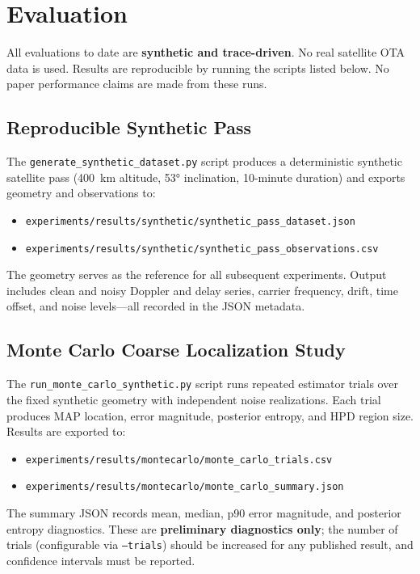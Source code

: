 \section{Evaluation}\label{sec:evaluation}

All evaluations to date are \textbf{synthetic and trace-driven}.
No real satellite OTA data is used.  Results are reproducible by running the
scripts listed below.  No paper performance claims are made from these runs.

\subsection{Reproducible Synthetic Pass}
The \texttt{generate\_synthetic\_dataset.py} script produces a deterministic
synthetic satellite pass (400~km altitude, 53° inclination, 10-minute duration)
and exports geometry and observations to:
\begin{itemize}
  \item \texttt{experiments/results/synthetic/synthetic\_pass\_dataset.json}
  \item \texttt{experiments/results/synthetic/synthetic\_pass\_observations.csv}
\end{itemize}
The geometry serves as the reference for all subsequent experiments.  Output
includes clean and noisy Doppler and delay series, carrier frequency, drift,
time offset, and noise levels---all recorded in the JSON metadata.

\subsection{Monte Carlo Coarse Localization Study}
The \texttt{run\_monte\_carlo\_synthetic.py} script runs repeated estimator
trials over the fixed synthetic geometry with independent noise realizations.
Each trial produces MAP location, error magnitude, posterior entropy, and HPD
region size.  Results are exported to:
\begin{itemize}
  \item \texttt{experiments/results/montecarlo/monte\_carlo\_trials.csv}
  \item \texttt{experiments/results/montecarlo/monte\_carlo\_summary.json}
\end{itemize}
The summary JSON records mean, median, p90 error magnitude, and posterior
entropy diagnostics.  These are \textbf{preliminary diagnostics only};
the number of trials (configurable via \texttt{--trials}) should be increased
for any published result, and confidence intervals must be reported.

